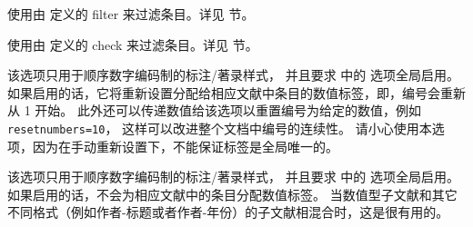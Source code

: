 \begin{optionlist*}

使用由  定义的 filter  来过滤条目。详见  节。



使用由  定义的 check  来过滤条目。详见   节。



该选项只用于顺序数字编码制的标注/著录样式，
并且要求  中的  选项全局启用。
如果启用的话，它将重新设置分配给相应文献中条目的数值标签，即，编号会重新从 1 开始。
此外还可以传递数值给该选项以重置编号为给定的数值，例如 \texttt{resetnumbers=10}，
这样可以改进整个文档中编号的连续性。
请小心使用本选项，因为在手动重新设置下，\biblatex 不能保证标签是全局唯一的。



该选项只用于顺序数字编码制的标注/著录样式，
并且要求  中的  选项全局启用。
如果启用的话，\biblatex 不会为相应文献中的条目分配数值标签。
当数值型子文献和其它不同格式（例如作者-标题或者作者-年份）的子文献相混合时，这是很有用的。

\end{optionlist*}

